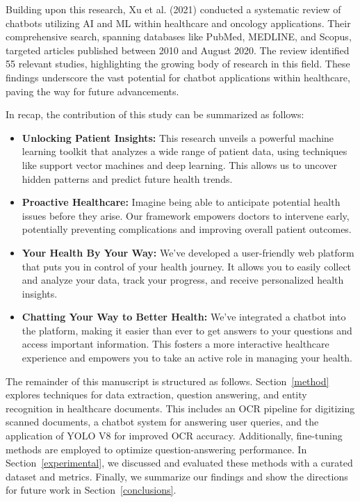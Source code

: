\documentclass[conference]{IEEEtran}
\begin{document}
    Building upon this research, Xu et al. (2021) \cite{xu2021chatbot} conducted a systematic review of chatbots utilizing AI and ML within healthcare and oncology applications. Their comprehensive search, spanning databases like PubMed, MEDLINE, and Scopus, targeted articles published between 2010 and August 2020. The review identified 55 relevant studies, highlighting the growing body of research in this field. These findings underscore the vast potential for chatbot applications within healthcare, paving the way for future advancements.

    In recap, the contribution of this study can be summarized as follows:
    \begin{itemize}
          \item \textbf{Unlocking Patient Insights:} This research unveils a powerful machine learning toolkit that analyzes a wide range of patient data, using techniques like support vector machines and deep learning. This allows us to uncover hidden patterns and predict future health trends.
          \item \textbf{Proactive Healthcare:} Imagine being able to anticipate potential health issues before they arise. Our framework empowers doctors to intervene early, potentially preventing complications and improving overall patient outcomes.
          \item \textbf{Your Health By Your Way:} We've developed a user-friendly web platform that puts you in control of your health journey. It allows you to easily collect and analyze your data, track your progress, and receive personalized health insights.
          \item \textbf{Chatting Your Way to Better Health:} We've integrated a chatbot into the platform, making it easier than ever to get answers to your questions and access important information. This fosters a more interactive healthcare experience and empowers you to take an active role in managing your health.
        \end{itemize}
    
    The remainder of this manuscript is structured as follows. Section~\ref{method} explores techniques for data extraction, question answering, and entity recognition in healthcare documents. This includes an OCR pipeline for digitizing scanned documents, a chatbot system for answering user queries, and the application of YOLO V8 for improved OCR accuracy. Additionally, fine-tuning methods are employed to optimize question-answering performance. In Section~\ref{experimental}, we discussed and evaluated these methods with a curated dataset and metrics. Finally, we summarize our findings and show the directions for future work in Section~\ref{conclusions}.
\end{document}
